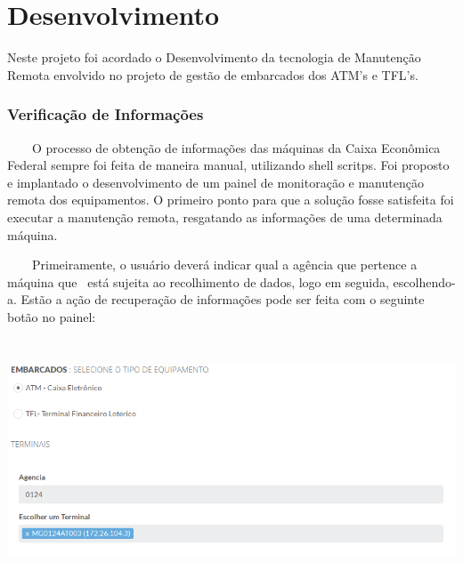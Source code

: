 \chapter[Desenvolvimento ]{Desenvolvimento}
Neste projeto foi acordado o Desenvolvimento da tecnologia de Manutenção Remota envolvido no projeto de gestão de embarcados dos ATM’s e TFL’s.

\subsection{Verifica\c{c}\~ao de Informa\c{c}\~oes}

\bigskip

{\color{black}
    \ \ \ \ O processo de obten\c{c}\~ao de informa\c{c}\~oes das m\'aquinas da Caixa Econ\^omica Federal sempre foi feita
        de maneira manual, utilizando shell scritps. Foi proposto e implantado o desenvolvimento de um painel de
        monitora\c{c}\~ao e manuten\c{c}\~ao remota dos equipamentos. O primeiro ponto para que a solu\c{c}\~ao fosse
        satisfeita foi executar a manuten\c{c}\~ao remota, resgatando as informa\c{c}\~oes de uma determinada m\'aquina. }

{\color{black}
    \ \ \ \ Primeiramente, o usu\'ario dever\'a indicar qual a ag\^encia que pertence a m\'aquina que \ est\'a sujeita ao
        recolhimento de dados, logo em seguida, escolhendo-a. Est\~ao a a\c{c}\~ao de recupera\c{c}\~ao de informa\c{c}\~oes
        pode ser feita com o seguinte bot\~ao no painel:}

        \begin{center}
        \includegraphics[width=17.029cm,height=7.22cm]{figuras/RATCETECATMSTFLS051718v2-img002.png}
        \end{center}


